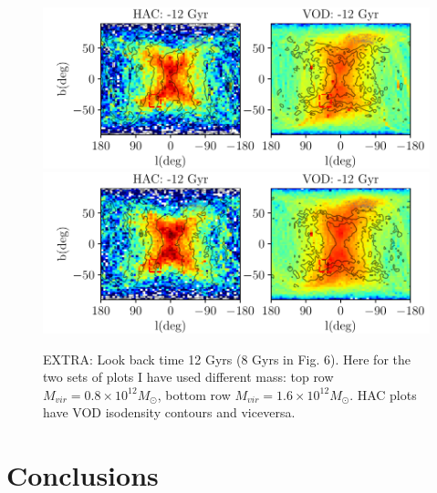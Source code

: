 \documentclass[fleqn,usenatbib]{mnras}
\begin{document}
\begin{figure}
	       	       \includegraphics[scale=0.52]{VOD_orbits_12Gyrs.pdf}\\
	       	       	       	       \includegraphics[scale=0.52]{VOD_orbits_12Gyrs_doublemass.pdf}
   \caption{EXTRA: Look back time 12 Gyrs (8 Gyrs in Fig. 6). Here for the two sets of plots I have used different mass: top row $M_{vir} = 0.8 \times 10^{12} M_{\odot}$, bottom row $M_{vir} = 1.6 \times 10^{12} M_{\odot}$.  HAC plots have VOD isodensity contours and viceversa.}
    \label{fig:orbitslb}
\end{figure}

\section{Conclusions}
\end{document}
